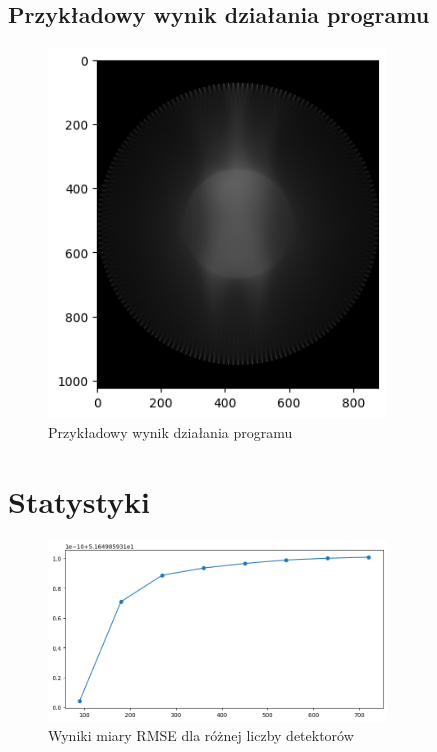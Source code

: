 \documentclass[11pt,a4paper]{article}
\begin{document}
    \subsection{Przykładowy wynik działania programu}
    \begin{figure}[H]
        \centering
        \includegraphics[width=0.8\textwidth]{inputoutput1}
        \caption{Przykładowy wynik działania programu}
    \end{figure}

    \section{Statystyki}
    \begin{figure}[H]
        \centering
        \includegraphics[width=0.8\textwidth]{rmse_detectors}
        \caption{Wyniki miary RMSE dla różnej liczby detektorów}
    \end{figure}
\end{document}
